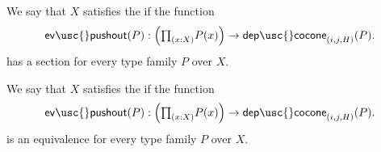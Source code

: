 \begin{defn}
  We say that $X$ satisfies the  if the function
  \begin{equation*}
  \mathsf{ev\usc{}pushout}(P):\Big(\prd{x:X}P(x)\Big)\to \mathsf{dep\usc{}cocone}_{(i,j,H)}(P).
  \end{equation*}
  has a section for every type family $P$ over $X$.
\end{defn}

\begin{defn}
  We say that $X$ satisfies the  if the function
  \begin{equation*}
  \mathsf{ev\usc{}pushout}(P):\Big(\prd{x:X}P(x)\Big)\to \mathsf{dep\usc{}cocone}_{(i,j,H)}(P).
  \end{equation*}
  is an equivalence for every type family $P$ over $X$.
\end{defn}

